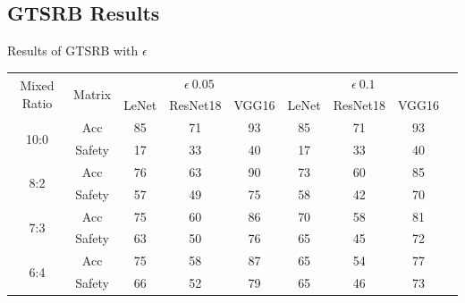 \documentclass[journal,article,submit,moreauthors,pdftex]{Definitions/mdpi}
\begin{document}
\subsection{GTSRB Results}

\begin{specialtable}[H]
    \centering
    \caption{Results of GTSRB with \begin{math}\epsilon\end{math}}
    \label{gtsrb-results}
    {\small
    \begin{tabular}{|c|c|c|c|c|c|c|c|c|}
    \hline
    \multirow{2}{*}{Mixed Ratio} & \multirow{2}{*}{Matrix} & \multicolumn{3}{c|}{\begin{math}\epsilon \ 0.05\end{math}}  & \multicolumn{3}{c|}{\begin{math}\epsilon \ 0.1\end{math}}       \\ \cline{3-8}
                                 &                           & LeNet               & ResNet18              & VGG16       & LeNet              & ResNet18              & VGG16              \\ \hline 
    \multirow{2}{*}{10:0}        & Acc                       & 85                  & 71                    & 93          & 85                 & 71                    & 93                 \\ \cline{2-8} 
                                 & Safety                    & 17                  & 33                    & 40          & 17                 & 33                    & 40                 \\ \hline 
    \multirow{2}{*}{8:2}         & Acc                       & 76                  & 63                    & 90          & 73                 & 60                    & 85                 \\ \cline{2-8} 
                                 & Safety                    & 57                  & 49                    & 75          & 58                 & 42                    & 70                 \\ \hline 
    \multirow{2}{*}{7:3}         & Acc                       & 75                  & 60                    & 86          & 70                 & 58                    & 81                 \\ \cline{2-8} 
                                 & Safety                    & 63                  & 50                    & 76          & 65                 & 45                    & 72                 \\ \hline 
    \multirow{2}{*}{6:4}         & Acc                       & 75                  & 58                    & 87          & 65                 & 54                    & 77                 \\ \cline{2-8} 
                                 & Safety                    & 66                  & 52                    & 79          & 65                 & 46                    & 73                 \\ \hline 
    \end{tabular}
    }
\end{specialtable}
\end{document}
